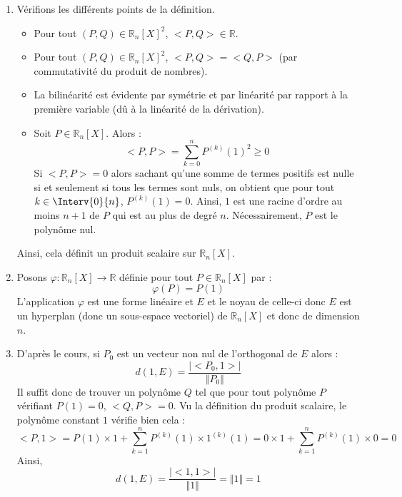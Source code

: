 \documentclass[a4paper,10pt]{report}
\begin{document}
\corr \begin{enumerate}
\item Vérifions les différents points de la définition.

\begin{itemize}
\item Pour tout $(P,Q) \in \mathbb{R}_n[X]^2$, $<P,Q> \in \mathbb{R}$.
\item Pour tout $(P,Q) \in \mathbb{R}_n[X]^2$, $<P,Q>= <Q,P>$ (par commutativité du produit de nombres).
\item La bilinéarité est évidente par symétrie et par linéarité par rapport à la première variable (dû à la linéarité de la dérivation).
\item Soit $P \in \mathbb{R}_n[X]$. Alors :
$$ <P,P> = \sum_{k=0}^{n} P^{(k)}(1)^2 \geq 0$$
Si $<P,P>=0$ alors sachant qu'une somme de termes positifs est nulle si et seulement si tous les termes sont nuls, on obtient que pour tout $k \in \Interv{0}{n}$, $P^{(k)}(1)=0$. Ainsi, $1$ est une racine d'ordre au moins $n+1$ de $P$ qui est au plus de degré $n$. Nécessairement, $P$ est le polynôme nul. 
\end{itemize}
Ainsi, cela définit un produit scalaire sur $\mathbb{R}_n[X]$.
\item Posons $\varphi : \mathbb{R}_n[X] \rightarrow \mathbb{R}$ définie pour tout $P \in \mathbb{R}_n[X]$ par :
$$ \varphi(P)= P(1)$$
L'application $\varphi$ est une forme linéaire et $E$ et le noyau de celle-ci donc $E$ est un hyperplan (donc un sous-espace vectoriel) de $\mathbb{R}_n[X]$ et donc de dimension $n$.
\item D'après le cours, si $P_0$ est un vecteur non nul de l'orthogonal de $E$ alors :
$$ d(1,E) = \dfrac{\vert <P_0,1> \vert }{\Vert P_0 \Vert}$$
Il suffit donc de trouver un polynôme $Q$ tel que pour tout polynôme $P$ vérifiant $P(1)=0$, $<Q,P>=0$. Vu la définition du produit scalaire, le polynôme constant $1$ vérifie bien cela :
$$ <P,1> = P(1) \times 1 + \sum_{k=1}^n P^{(k)}(1) \times 1^{(k)}(1) = 0\times 1 + \sum_{k=1}^n P^{(k)}(1) \times 0 = 0$$
Ainsi,
$$ d(1,E) = \dfrac{\vert <1,1> \vert }{\Vert 1 \Vert} = \Vert 1 \Vert = 1$$
\end{enumerate}
\end{document}
